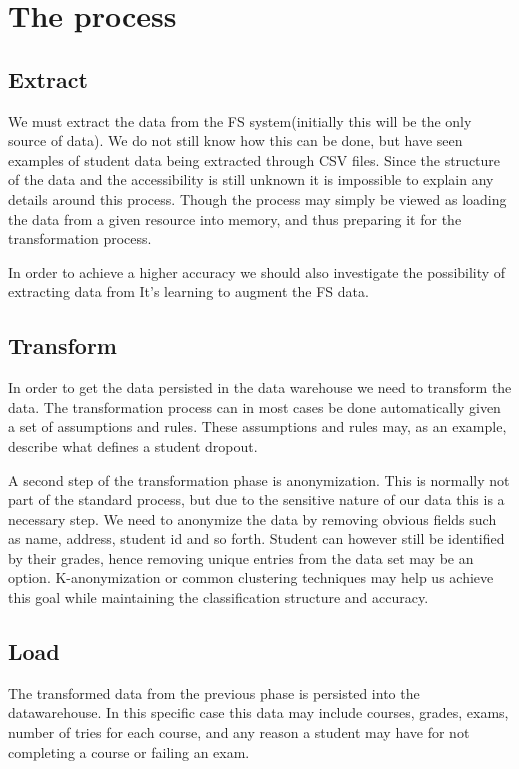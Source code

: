 \section{The process}
\subsection{Extract}
We must extract the data from the FS system(initially this will be the only source of data). We do not still know how this can be done, but have seen examples of student data being extracted through CSV files. 
Since the structure of the data and the accessibility is still unknown it is impossible to explain any details around this process.
Though the process may simply be viewed as loading the data from a given resource into memory, and thus preparing it for the transformation process.

\bigskip\noindent
In order to achieve a higher accuracy we should also investigate 
the possibility of extracting data from It's learning to augment the FS data.

\subsection{Transform}
In order to get the data persisted in the data warehouse we need to transform the data.
The transformation process can in most cases be done automatically given a set of assumptions and rules.
These assumptions and rules may, as an example, describe what defines a student dropout. 

\bigskip\noindent
A second step of the transformation phase is anonymization. 
This is normally not part of the standard process, but due to the sensitive nature of our data this is a necessary step.
We need to anonymize the data by removing obvious fields such as name, address, student id and so forth. 
Student can however still be identified by their grades, hence removing unique entries from the data set may be an option.
K-anonymization or common clustering techniques may help us achieve this goal while maintaining the classification structure and accuracy.

\subsection{Load}
The transformed data from the previous phase is persisted into the datawarehouse. 
In this specific case this data may include courses, grades, exams, number of tries for each course, 
and any reason a student may have for not completing a course or failing an exam.

